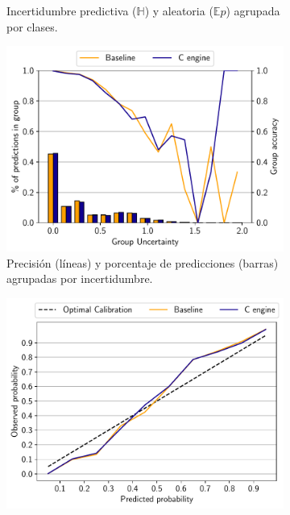 \begin{figure}[h]
\begin{subfigure}[b]{0.48\textwidth}
     	\caption{Incertidumbre predictiva ($\mathbb{H}$) y aleatoria ($\mathbb{E}p$) agrupada por clases.\\}
     	\label{fig:example_class}
 	\end{subfigure}
 	\hfill
 	\begin{subfigure}[b]{0.48\textwidth}
     	\centering
     	\includegraphics[width=\textwidth]{root/Imagenes/bnn_lib/acc_vs_unc.pdf}
     	\caption{Precisión (líneas) y porcentaje de predicciones (barras) agrupadas por incertidumbre.}
     	\label{fig:example_acc_unc}
 	\end{subfigure}
 	\hfill
 	\begin{subfigure}[b]{0.48\textwidth}
     	\centering
     	\includegraphics[width=\textwidth]{root/Imagenes/bnn_lib/calibration.pdf}

\end{subfigure}
\end{figure}
